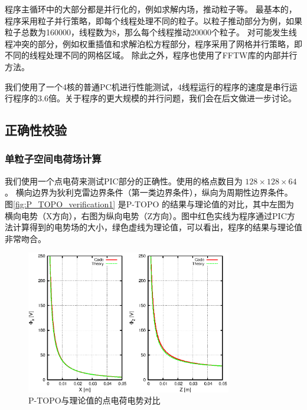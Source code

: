 程序主循环中的大部分都是并行化的，例如求解内场，推动粒子等。
最基本的，程序采用粒子并行策略，即每个线程处理不同的粒子。以粒子推动部分为例，如果粒子总数为160000，线程数为8，那么每个线程推动20000个粒子。
对可能发生线程冲突的部分，例如权重插值和求解泊松方程部分，程序采用了网格并行策略，即不同的线程处理不同的网格区域。
除此之外，程序也使用了FFTW库的内部并行方法。



我们使用了一个4核的普通PC机进行性能测试，4线程运行的程序的速度是串行运行程序的3.6倍。关于程序的更大规模的并行问题，我们会在后文做进一步讨论。

\subsection{正确性校验}
\subsubsection{单粒子空间电荷场计算}
我们使用一个点电荷来测试PIC部分的正确性。使用的格点数目为 $128\times128\times64$。 横向边界为狄利克雷边界条件（第一类边界条件），纵向为周期性边界条件。 图\eqref{fig:P_TOPO_verification1} 是P-TOPO 的结果与理论值的对比，其中左图为横向电势（X方向），右图为纵向电势（Z方向）。图中红色实线为程序通过PIC方法计算得到的电势场的大小，绿色虚线为理论值，可以看出，程序的结果与理论值非常吻合。

\begin{figure}[!htb]
    \centering
    \includegraphics[width=0.8\textwidth]{Img/P_TOPO_verification1.eps}
    \caption{P-TOPO与理论值的点电荷电势对比}
    \label{fig:P_TOPO_verification1}
\end{figure}

